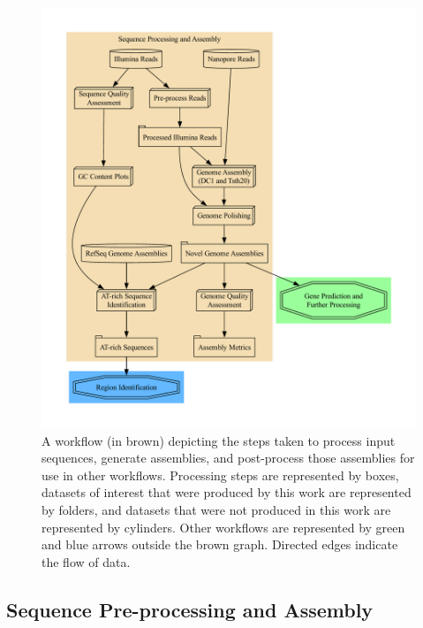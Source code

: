 \begin{figure}
  \centering
  \includegraphics[width=\textwidth]{figures/assembly-met.pdf}
  \caption[Sequence assembly and processing workflow]{A workflow (in brown) depicting the steps taken to process
    input sequences, generate assemblies, and post-process those
    assemblies for use in other workflows. Processing steps are
    represented by boxes, datasets of interest that were produced by
    this work are represented by folders, and datasets that were not
    produced in this work are represented by cylinders. Other
    workflows are represented by green and blue arrows outside the
    brown graph. Directed edges indicate the flow of data.}\label{fig:seq-workflow}
\end{figure}

\subsection{Sequence Pre-processing and Assembly}\label{met:seq-process}

